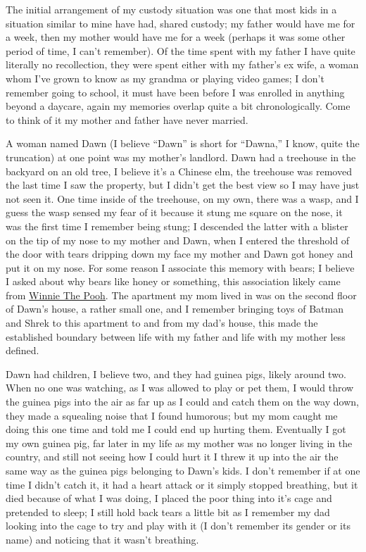 \documentclass[12pt]{article}
\begin{document}
The initial arrangement of my custody situation was one that most kids in a
situation similar to mine have had, shared custody; my father would have me for
a week, then my mother would have me for a week (perhaps it was some other
period of time, I can't remember).  Of the time spent with my father I have
quite literally no recollection, they were spent either with my father's ex
wife, a woman whom I've grown to know as my grandma or playing video games; I
don't remember going to school, it must have been before I was enrolled in
anything beyond a daycare, again my memories overlap quite a bit
chronologically.  Come to think of it my mother and father have never married.

A woman named Dawn (I believe ``Dawn'' is short for ``Dawna,'' I know, quite the
truncation) at one point was my mother's landlord.  Dawn had a treehouse in the
backyard on an old tree, I believe it's a Chinese elm, the treehouse was removed
the last time I saw the property, but I didn't get the best view so I may have
just not seen it.  One time inside of the treehouse, on my own, there was a
wasp, and I guess the wasp sensed my fear of it because it stung me square on
the nose, it was the first time I remember being stung; I descended the latter
with a blister on the tip of my nose to my mother and Dawn, when I entered the
threshold of the door with tears dripping down my face my mother and Dawn got
honey and put it on my nose.  For some reason I associate this memory with
bears; I believe I asked about why bears like honey or something, this
association likely came from
{\color{blue}\underline{\href{https://winniethepooh.disney.com/}{Winnie The
Pooh}}}.  The apartment my mom lived in was on the second floor of Dawn's house,
a rather small one, and I remember bringing toys of Batman and Shrek to this
apartment to and from my dad's house, this made the established boundary between
life with my father and life with my mother less defined.

Dawn had children, I believe two, and they had guinea pigs, likely around two.
When no one was watching, as I was allowed to play or pet them, I would throw
the guinea pigs into the air as far up as I could and catch them on the way
down, they made a squealing noise that I found humorous; but my mom caught me
doing this one time and told me I could end up hurting them.  Eventually I got
my own guinea pig, far later in my life as my mother was no longer living in the
country, and still not seeing how I could hurt it I threw it up into the air the
same way as the guinea pigs belonging to Dawn's kids.  I don't remember if at
one time I didn't catch it, it had a heart attack or it simply stopped
breathing, but it died because of what I was doing, I placed the poor thing into
it's cage and pretended to sleep; I still hold back tears a little bit as I
remember my dad looking into the cage to try and play with it (I don't remember
its gender or its name) and noticing that it wasn't breathing.
\end{document}
